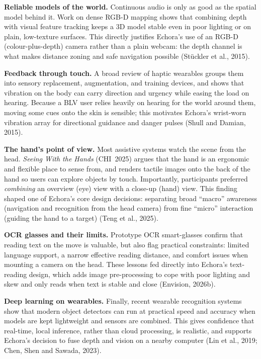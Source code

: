 \textbf{Reliable models of the world.} Continuous audio is only as good as the spatial model behind it. Work on dense RGB-D mapping shows that combining depth with visual feature tracking keeps a 3D model stable even in poor lighting or on plain, low-texture surfaces. This directly justifies Echora's use of an RGB-D (colour-plus-depth) camera rather than a plain webcam: the depth channel is what makes distance zoning and safe navigation possible (St\"uckler et al., 2015).

\textbf{Feedback through touch.} A broad review of haptic wearables groups them into sensory replacement, augmentation, and training devices, and shows that vibration on the body can carry direction and urgency while easing the load on hearing. Because a BLV user relies heavily on hearing for the world around them, moving some cues onto the skin is sensible; this motivates Echora's wrist-worn vibration array for directional guidance and danger pulses (Shull and Damian, 2015).

\textbf{The hand's point of view.} Most assistive systems watch the scene from the head. \emph{Seeing With the Hands} (CHI~2025) argues that the hand is an ergonomic and flexible place to sense from, and renders tactile images onto the back of the hand so users can explore objects by touch. Importantly, participants preferred \emph{combining} an overview (eye) view with a close-up (hand) view. This finding shaped one of Echora's core design decisions: separating broad ``macro'' awareness (navigation and recognition from the head camera) from fine ``micro'' interaction (guiding the hand to a target) (Teng et al., 2025).

\textbf{OCR glasses and their limits.} Prototype OCR smart-glasses confirm that reading text on the move is valuable, but also flag practical constraints: limited language support, a narrow effective reading distance, and comfort issues when mounting a camera on the head. These lessons fed directly into Echora's text-reading design, which adds image pre-processing to cope with poor lighting and skew and only reads when text is stable and close (Envision, 2026b).

\textbf{Deep learning on wearables.} Finally, recent wearable recognition systems show that modern object detectors can run at practical speed and accuracy when models are kept lightweight and sensors are combined. This gives confidence that real-time, local inference, rather than cloud processing, is realistic, and supports Echora's decision to fuse depth and vision on a nearby computer (Lin et al., 2019; Chen, Shen and Sawada, 2023).

